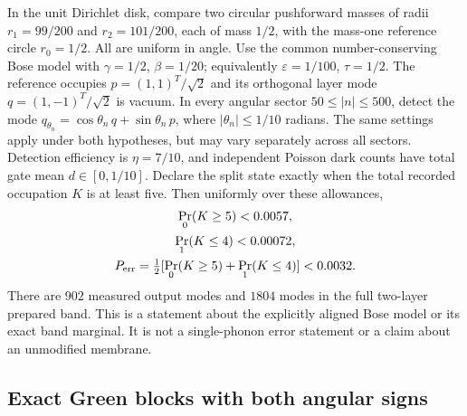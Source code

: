 \documentclass[aps,pra,reprint,superscriptaddress,longbibliography]{revtex4-2}
\begin{document}
In the unit Dirichlet disk, compare two circular pushforward masses
of radii $r_1=99/200$ and $r_2=101/200$, each of mass $1/2$, with
the mass-one reference circle $r_0=1/2$. All are uniform in angle.
Use the common number-conserving Bose model with
$\gamma=1/2$, $\beta=1/20$; equivalently
$\varepsilon=1/100$, $\tau=1/2$.
The reference occupies $p=(1,1)^T/\sqrt2$ and its orthogonal layer
mode $q=(1,-1)^T/\sqrt2$ is vacuum. In every angular sector
$50\le|n|\le500$, detect the mode
$q_{\theta_n}=\cos\theta_n\,q+\sin\theta_n\,p$, where
$|\theta_n|\le1/10$ radians. The same settings apply under both
hypotheses, but may vary separately across all sectors. Detection
efficiency is $\eta=7/10$, and independent Poisson dark counts have
total gate mean $d\in[0,1/10]$. Declare the split state exactly when
the total recorded occupation $K$ is at least five. Then uniformly
over these allowances,
\begin{equation}
\begin{gathered}
 \Pr_0(K\ge5)<0.0057,\\
 \Pr_1(K\le4)<0.00072,\\
 P_{\rm err}=\tfrac12[\Pr_0(K\ge5)+\Pr_1(K\le4)]<0.0032.
 \label{sgt:finite:error-statement}
\end{gathered}
\end{equation}
There are $902$ measured output modes and $1804$ modes in the full
two-layer prepared band. This is a statement about the explicitly
aligned Bose model or its exact band marginal. It is not a
single-phonon error statement or a claim about an unmodified membrane.

\subsection{Exact Green blocks with both angular signs}
\label{sgt:finite:blocks}
\end{document}
